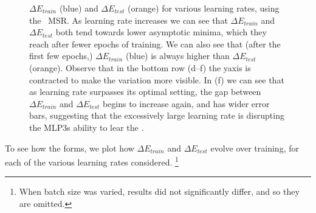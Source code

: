 \begin{figure}[t]
{    }
    \caption{
            $\Delta E_{train}$ (blue) and $\Delta E_{test}$ (orange) for various learning rates, using the 
            \POWERLAW~MSR. As learning rate increases we can see that $\Delta E_{train}$ and $\Delta E_{test}$ both tend 
            towards lower asymptotic minima, which they reach after fewer epochs of training. We can also see that 
            (after the first few epochs,) $\Delta E_{train}$ (blue) is always higher than $\Delta E_{test}$ (orange). 
            Observe that in the bottom row (d--f) the yaxis is contracted to make the variation more visible. In (f) we can see 
            that as learning rate surpasses its optimal setting, the gap between $\Delta E_{train}$ and $\Delta 
            E_{test}$ begins to increase again, and has wider error bars, suggesting that the excessively large learning 
            rate is disrupting the MLP3s ability to lear the \EffectiveCorrelationSpace.
    }
    \label{fig:mlp3-msr-results-xmin}
\end{figure}



To see how the \EffectiveCorrelationSpace forms, we plot how $\Delta E_{train}$ and $\Delta E_{test}$ evolve over training, for each of the various learning rates considered.%
\footnote{When batch size was varied, results did not significantly differ, and so they are omitted. 
} 

